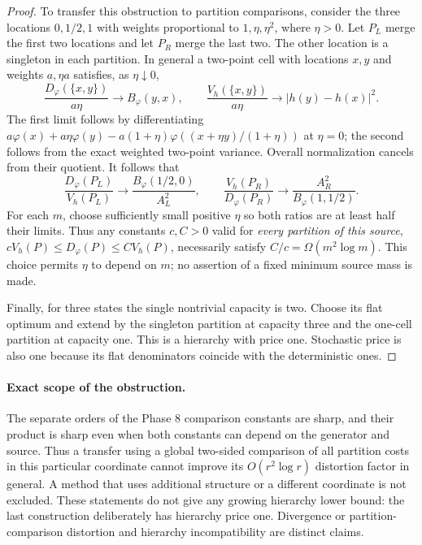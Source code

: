 \begin{proof}
To transfer this obstruction to partition comparisons, consider the
three locations $0,1/2,1$ with weights proportional to
$1,\eta,\eta^2$, where $\eta>0$. Let $P_L$ merge the first two
locations and let $P_R$ merge the last two. The other location is a
singleton in each partition. In general a two-point cell with locations
$x,y$ and weights $a,\eta a$ satisfies, as $\eta\downarrow0$,
\[
 \frac{D_\varphi(\{x,y\})}{a\eta}\longrightarrow B_\varphi(y,x),
 \qquad
 \frac{V_h(\{x,y\})}{a\eta}\longrightarrow
       |h(y)-h(x)|^2.
\]
The first limit follows by differentiating
$a\varphi(x)+a\eta\varphi(y)-a(1+\eta)
\varphi((x+\eta y)/(1+\eta))$ at $\eta=0$; the second follows from
the exact weighted two-point variance. Overall normalization cancels
from their quotient. It follows that
\[
 \frac{D_\varphi(P_L)}{V_h(P_L)}\longrightarrow
      \frac{B_\varphi(1/2,0)}{A_L^2},\qquad
 \frac{V_h(P_R)}{D_\varphi(P_R)}\longrightarrow
      \frac{A_R^2}{B_\varphi(1,1/2)}.
\]
For each $m$, choose sufficiently small positive $\eta$ so both ratios
are at least half their limits. Thus any constants $c,C>0$ valid for
\emph{every partition of this source},
$cV_h(P)\leq D_\varphi(P)\leq C V_h(P)$, necessarily satisfy
$C/c=\Omega(m^2\log m)$. This choice permits $\eta$ to depend on $m$;
no assertion of a fixed minimum source mass is made.

Finally, for three states the single nontrivial capacity is two. Choose
its flat optimum and extend by the singleton partition at capacity
three and the one-cell partition at capacity one. This is a hierarchy
with price one. Stochastic price is also one because its flat
denominators coincide with the deterministic ones.
\end{proof}

\paragraph{Exact scope of the obstruction.}
The separate orders of the Phase 8 comparison constants are sharp, and
their product is sharp even when both constants can depend on the
generator and source. Thus a transfer using a global two-sided
comparison of all partition costs in this particular coordinate cannot
improve its $O(r^2\log r)$ distortion factor in general. A method that
uses additional structure or a different coordinate is not excluded.
These statements do not give any growing hierarchy lower bound: the
last construction deliberately has hierarchy price one. Divergence or
partition-comparison distortion and hierarchy incompatibility are
distinct claims.
